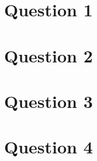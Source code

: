 \documentclass{article}
\begin{document}
\section*{Question 1}

\section*{Question 2}

\section*{Question 3}

\section*{Question 4}
\end{document}
